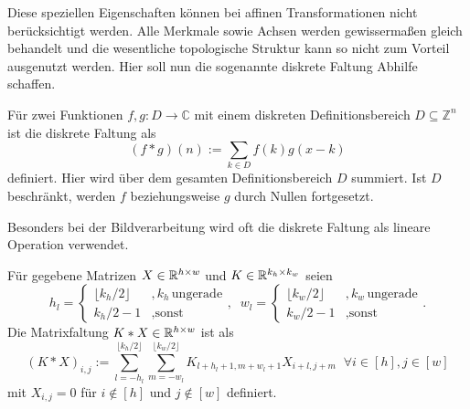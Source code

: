 Diese speziellen Eigenschaften können bei affinen Transformationen nicht berücksichtigt werden. Alle Merkmale sowie Achsen werden gewissermaßen gleich behandelt und die wesentliche topologische Struktur kann so nicht zum Vorteil ausgenutzt werden. Hier soll nun die sogenannte diskrete Faltung Abhilfe schaffen.

\begin{defi}\label{disk_faltung}
    Für zwei Funktionen $f,g: D \rightarrow \mathbb{C}$ mit einem diskreten Definitionsbereich $D \subseteq \mathbb{Z}^n$ ist die diskrete Faltung als
    \begin{equation*}
        (f \ast g) (n) := \sum_{k \in D} f(k) g(x-k)
    \end{equation*}
    definiert. Hier wird über dem gesamten Definitionsbereich $D$ summiert. Ist $D$ beschränkt, werden $f$ beziehungsweise $g$ durch Nullen fortgesetzt. 
   \end{defi}

Besonders bei der Bildverarbeitung wird oft die diskrete Faltung als lineare Operation verwendet. 

\begin{defi} \label{matrix_faltung}
    Für gegebene Matrizen $X \in \mathbb{R}^{h \times w}$ und $K \in \mathbb{R}^{k_h \times k_w}$ seien 
    \begin{equation*}
        h_l=\begin{cases}
           \lfloor k_h/2  \rfloor &, k_h \, \text{ungerade} \\
           k_h/2-1 &, \text{sonst}
        \end{cases}, \; \; 
        w_l=\begin{cases}
            \lfloor k_w/2 \rfloor &, k_w \, \text{ungerade} \\
            k_w/2 -1 &, \text{sonst}    
        \end{cases}.
    \end{equation*} 
    Die Matrixfaltung $K \ast X \in \mathbb{R}^{h \times w}$ ist als 
    \begin{equation}
        \label{matrix_faltung_op}
        (K \ast X)_{i,j}:=\sum_{l=-h_l}^{\lfloor k_h/2  \rfloor} \sum_{m=-w_l}^{\lfloor k_w/2 \rfloor} K_{l+h_l+1, m+w_l+1} X_{i+l,j+m} \; \; \forall i \in [h], j \in [w]
    \end{equation} mit $X_{i,j}=0$ für $i \notin [h]$ und $j \notin [w]$ definiert.
    \end{defi}

